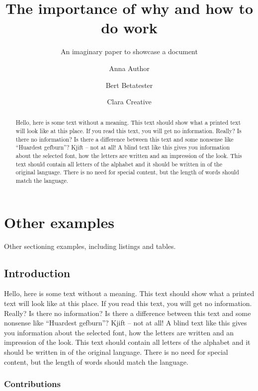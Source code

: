 \documentclass[%
  english,%
  todotools=true,%
  trtype=singlereport,draft%
]{hpitr}
\begin{document}
\title{The importance of why and how to do work}
\subtitle{An imaginary paper to showcase a document}
\author{Anna Author\and Bert Betatester\and Clara Creative}
\maketitle

\begin{abstract}
  Hello, here is some text without a meaning. This text should show
  what a printed text will look like at this place. If you read this
  text, you will get no information. Really? Is there no
  information? Is there a difference between this text and some
  nonsense like “Huardest gefburn”? Kjift – not at all! A blind text
  like this gives you information about the selected font, how the
  letters are written and an impression of the look. This text
  should contain all letters of the alphabet and it should be
  written in of the original language. There is no need for special
  content, but the length of words should match the language.
\end{abstract}
\tableofcontents
\lstlistoflistings

\Blinddocument

\chapter{Other examples}
\label{cha:other}

Other sectioning examples, including listings and tables.


\section{Introduction}
\label{sec:introduction}

Hello, here is some text without a meaning. This text should show
what a printed text will look like at this place. If you read this
text, you will get no information. Really? Is there no information?
Is there a difference between this text and some nonsense like
“Huardest gefburn”? Kjift – not at all! A blind text like this gives
you information about the selected font, how the letters are written
and an impression of the look. This text should contain all letters
of the alphabet and it should be written in of the original
language. There is no need for special content, but the length of
words should match the language.

\subsection{Contributions}
\label{sec:contributions}
\end{document}
